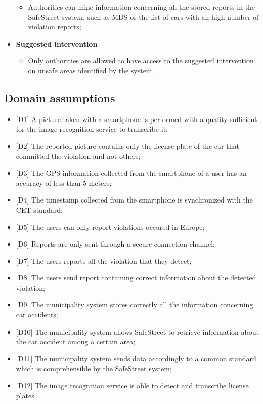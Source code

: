 \begin{itemize}
\begin{itemize}
            \item Authorities can mine information concerning all the stored reports in the SafeStreet system, such as MDS or the list of cars with an high number of violation reports;
        \end{itemize}
    \item \textbf{Suggested intervention}
        \begin{itemize}
            \item Only authorities are allowed to have access to the suggested intervention on unsafe areas identified by the system.
        \end{itemize}
    \end{itemize}
\subsection{Domain assumptions}
\begin{itemize}
    \item {[D1]}  A picture taken with a smartphone is performed with a quality sufficient for the image recognition service to transcribe it;
    \item {[D2]}  The reported picture contains only the license plate of the car that committed the violation and not others;
    \item {[D3]}  The GPS information collected from the smartphone of a user has an accuracy of less than 5 meters;
    \item {[D4]}  The timestamp collected from the smartphone is synchronized with the CET standard;
    \item {[D5]}  The users can only report violations occured in Europe;
    \item {[D6]}  Reports are only sent through a secure connection channel;
    \item {[D7]}  The users reports all the violation that they detect;
    \item {[D8]}  The users send report containing correct information about the detected violation;
    \item {[D9]}  The municipality system stores correctly all the information concerning car accidents;
    \item {[D10]} The municipality system allows SafeStreet to retrieve information about the car accident among a certain area;
    \item {[D11]} The municipality system sends data accordingly to a common standard which is comprehensible by the SafeStreet system;
    \item {[D12]} The image recognition service is able to detect and transcribe license plates.
\end{itemize}

